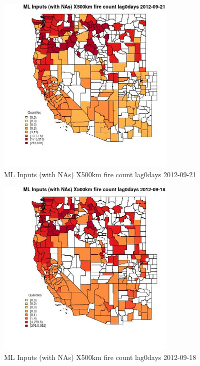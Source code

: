 \clearpage 

\begin{figure} 
\centering  
\includegraphics[width=0.77\textwidth]{Code_Outputs/Report_ML_input_PM25_Step4_part_e_de_duplicated_aves_compiled_2019-05-14wNAs_CountyX500km_fire_count_lag0daysMean2012-09-21_2012-09-21.jpg} 
\caption{\label{fig:Report_ML_input_PM25_Step4_part_e_de_duplicated_aves_compiled_2019-05-14wNAsCountyX500km_fire_count_lag0daysMean2012-09-21_2012-09-21}ML Inputs (with NAs) X500km fire count lag0days 2012-09-21} 
\end{figure} 
 

\begin{figure} 
\centering  
\includegraphics[width=0.77\textwidth]{Code_Outputs/Report_ML_input_PM25_Step4_part_e_de_duplicated_aves_compiled_2019-05-14wNAs_CountyX500km_fire_count_lag0daysMean2012-09-18_2012-09-18.jpg} 
\caption{\label{fig:Report_ML_input_PM25_Step4_part_e_de_duplicated_aves_compiled_2019-05-14wNAsCountyX500km_fire_count_lag0daysMean2012-09-18_2012-09-18}ML Inputs (with NAs) X500km fire count lag0days 2012-09-18} 
\end{figure} 
 

